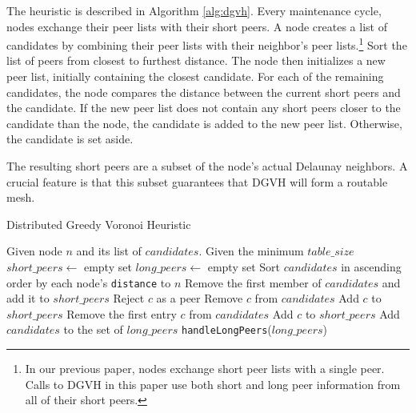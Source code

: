 The heuristic is described in Algorithm \ref{alg:dgvh}.
Every maintenance cycle, nodes exchange their peer lists with their short peers.
A node creates a list of candidates by combining their peer lists with their neighbor's peer lists.\footnote{In our previous paper, nodes exchange short peer lists with a single peer. Calls to DGVH in this paper use both short and long peer information from all of their short peers.}
Sort the list of peers from closest to furthest distance.
The node then initializes a new peer list, initially containing the closest candidate.
For each of the remaining candidates, the node compares the distance between the current short peers and the candidate.
If the new peer list does not contain any short  peers closer to the candidate than the node, the candidate is added to the new peer list.
Otherwise, the candidate is set aside.

The resulting short peers are a subset of the node's actual Delaunay neighbors.
A crucial feature is that this subset guarantees that DGVH will form a routable mesh.


\begin{algorithm} %
	\caption{Distributed Greedy Voronoi Heuristic}
	\label{alg:dgvh}
	\small
	\begin{algorithmic}[1]  %
		\State Given node $n$ and its list of $candidates$.
		\State Given the minimum $table\_size$
		\State $short\_peers \leftarrow$ empty set%
		\State $long\_peers \leftarrow$ empty set %
		\State Sort $candidates$ in ascending order by each node's \texttt{distance} to $n$
		\State Remove the first member of $candidates$ and add it to $short\_peers$
				\State Reject $c$ as a peer
			\Else
				\State Remove $c$ from $candidates$
				\State Add $c$ to $short\_peers$
			\EndIf
		\EndFor
			\State Remove the first entry $c$ from $candidates$
			\State Add $c$ to $short\_peers$
		\EndWhile
		\State Add $candidates$ to the set of $long\_peers$	
		\State \texttt{handleLongPeers}($long\_peers$)
	\end{algorithmic}
\end{algorithm} 


